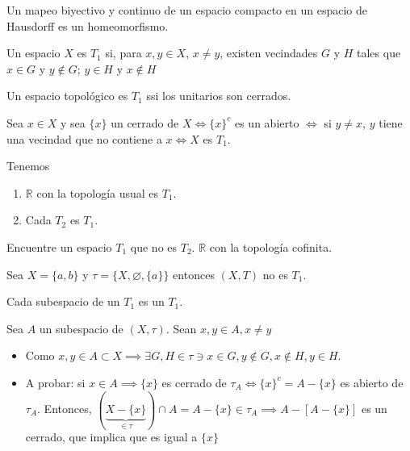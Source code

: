 \begin{teorema}
    Un mapeo biyectivo y continuo de un espacio compacto en un espacio de Hausdorff es un homeomorfismo. 
\end{teorema}


\begin{definicion}
    Un espacio $X$ es $T_1$ si, para $x,y\in X$, $x\neq y$, existen vecindades $G$ y $H$ tales que $x\in G$ y $y\not\in G$; $y\in H$ y $x\not\in H$ 
\end{definicion}

\begin{teorema}
    Un espacio topológico es $T_1$ ssi los unitarios son cerrados. 
    \begin{dem}
        Sea $x\in X$ y sea $\{x\}$ un cerrado de $X\iff \{x\}^c$ es un abierto $\iff$ si $y\neq x$, $y$ tiene una vecindad que no contiene a $x\iff X$ es $T_1$. 
    \end{dem}
\end{teorema}

\begin{prop}
    Tenemos 
    \begin{enumerate}
        \item $\mathbb{R}$ con la topología usual es $T_1$. 
        \item Cada $T_2$ es $T_1$. 
    \end{enumerate}
\end{prop}

\begin{ejemplo}
    Encuentre un espacio $T_1$ que no es $T_2$. $\mathbb{R}$ con la topología cofinita. 
\end{ejemplo}
\begin{ejemplo}
    Sea $X=\{a,b\}$ y $\tau=\{X,\varnothing, \{
        a\}\}$ entonces $(X,T)$ no es $T_1$. 
\end{ejemplo}

\begin{teorema}
    Cada subespacio de un $T_1$ es un $T_1$. 
    \begin{dem}
        Sea $A$ un subespacio de $(X,\tau)$. Sean $x,y\in A,x\neq y $
        \begin{itemize}
            \item Como $x,y\in A\subset X\implies \exists G,H\in \tau\ni x\in G, y\not\in G, x\not\in H, y\in H$. 
            \item A probar: si $x\in A\implies \{x\}$ es cerrado de $\tau_A\iff \{x\}^c =A-\{x\}$ es abierto de $\tau_A$. Entonces, $(\underbrace{X-\{x\}}_{\in\tau})\cap A = A-\{x\}\in \tau_A\implies A-\left[A-\{x\}\right]$ es un cerrado, que implica que es igual a $\{x\}$
        \end{itemize}
    \end{dem}
\end{teorema}

